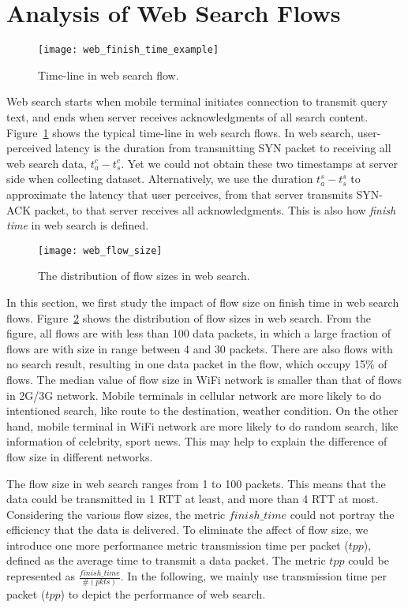 
\section{Analysis of Web Search Flows}
\label{sec:web_search}

\begin{figure}[th]
\centering
	\texttt{[image: web\_finish\_time\_example]}
\caption{Time-line in web search flow.}
\label{fig:web_finish_time_example}
\end{figure}

Web search starts when mobile terminal initiates connection to transmit query text, and ends when server receives acknowledgments of all search content. Figure~\ref{fig:web_finish_time_example} shows the typical time-line in web search flows. In web search, user-perceived latency is the duration from transmitting SYN packet to receiving all web search data, \ie $t^c_a - t^c_s$. Yet we could not obtain these two timestamps at server side when collecting dataset. Alternatively, we use the duration $t^s_a - t^s_s$ to approximate the latency that user perceives, \ie from that server transmits SYN-ACK packet, to that server receives all acknowledgments. This is also how \emph{finish time} in web search is defined.

\begin{figure}[th]
\centering
	\texttt{[image: web\_flow\_size]}
\caption{The distribution of flow sizes in web search.}
\label{fig:web_flow_size}
\end{figure}

In this section, we first study the impact of flow size on finish time in web search flows. Figure~\ref{fig:web_flow_size} shows the distribution of flow sizes in web search.  From the figure, all flows are with less than 100 data packets, in which a large fraction of flows are with size in range between 4 and 30 packets. There are also flows with no search result, resulting in one data packet in the flow, which occupy 15\% of flows. The median value of flow size in WiFi network is smaller than that of flows in 2G/3G network. Mobile terminals in cellular network are more likely to do intentioned search, like route to the destination, weather condition. On the other hand, mobile terminal in WiFi network are more likely to do random search, like information of celebrity, sport news. This may help to explain the difference of flow size in different networks.

The flow size in web search ranges from 1 to 100 packets. This means that the data could be transmitted in 1 RTT at least, and more than 4 RTT at most. Considering the various flow sizes, the metric $finish\_time$ could not portray the efficiency that the data is delivered. To eliminate the affect of flow size, we introduce one more performance metric transmission time per packet ($tpp$), defined as the average time to transmit a data packet. The metric $tpp$ could be represented as $\frac{finish\_time}{\#(pkts)}$. In the following, we mainly use transmission time per packet ($tpp$) to depict the performance of web search.

